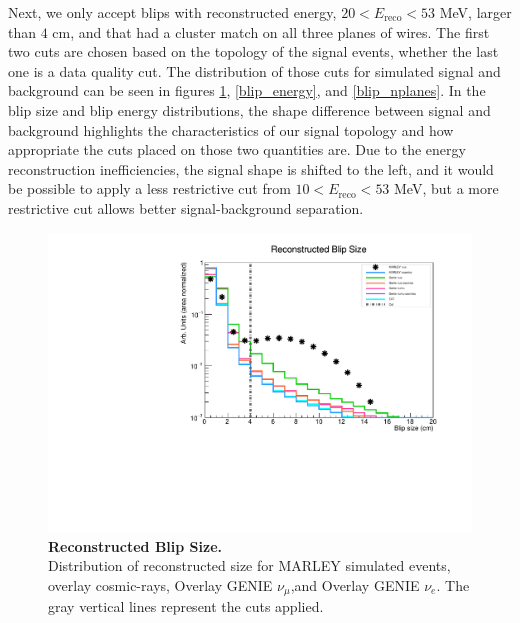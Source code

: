 Next, we only accept blips with reconstructed energy, $20 < E_\text{reco} < 53$ MeV, larger than $4$ cm, and that had a cluster match on all three planes of wires. The first two cuts are chosen based on the topology of the signal events, whether the last one is a data quality cut.
The distribution of those cuts for simulated signal and background can be seen in figures \ref{blip_size}, \ref{blip_energy}, and \ref{blip_nplanes}. In the blip size and blip energy distributions, the shape difference between signal and background highlights the characteristics of our signal topology and how appropriate the cuts placed on those two quantities are. Due to the energy reconstruction inefficiencies, the signal shape is shifted to the left, and it would be possible to apply a less restrictive cut from $10 < E_\text{reco} < 53$ MeV, but a more restrictive cut allows better signal-background separation. 

\begin{figure}[h!]
    \centering
    \includegraphics[width=120mm]{Figures/blip_size.pdf}
    \caption[Reconstructed Blip Size.]{{\textbf{Reconstructed Blip Size.}}\\ Distribution of reconstructed size for MARLEY simulated events, overlay cosmic-rays, Overlay GENIE $\nu_{\mu}$,and Overlay GENIE $\nu_{e}$. The gray vertical lines represent the cuts applied.}
 \label{blip_size}
\end{figure}

